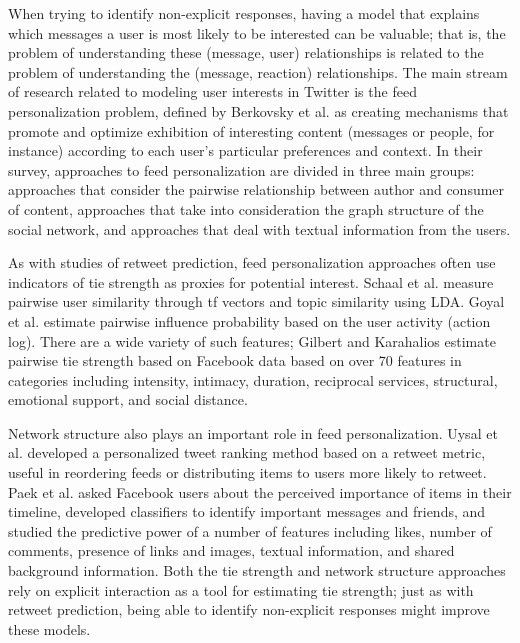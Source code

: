 When trying to identify non-explicit responses, having a model that explains which messages a user is most likely to be interested can be valuable; that is, the problem of understanding these (message, user) relationships is related to the problem of understanding the (message, reaction) relationships.  
The main stream of research related to modeling user interests in Twitter is the feed personalization problem, defined by Berkovsky et al. \cite{Berkovsky2015} as creating mechanisms that promote and optimize exhibition of interesting content (messages or people, for instance) according to each user's particular preferences and context.  
In their survey, approaches to feed personalization are divided in three main groups: approaches that consider the pairwise relationship between author and consumer of content, approaches that take into consideration the graph structure of the social network, and approaches that deal with textual information from the users.

As with studies of retweet prediction, feed personalization approaches often use indicators of tie strength as proxies for potential interest.  
Schaal et al. \cite{Schaal2012} measure pairwise user similarity through tf vectors and topic similarity using LDA. 
Goyal et al. \cite{Goyal2010} estimate pairwise influence probability based on the user activity (action log).  There are a wide variety of such features; Gilbert and Karahalios \cite{Gilbert2009} estimate pairwise tie strength based on Facebook data based on over 70 features in categories including intensity, intimacy, duration, reciprocal services, structural, emotional support, and social distance.  

Network structure also plays an important role in feed personalization.  
Uysal et al. \cite{Uysal2011} developed a personalized tweet ranking method based on a retweet metric, useful in reordering feeds or distributing items to users more likely to retweet. 
Paek et al. \cite{Paek2010} asked Facebook users about the perceived importance of items in their timeline, developed classifiers to identify important messages and friends, and studied the predictive power of a number of features including likes, number of comments, presence of links and images, textual information, and shared background information. 
Both the tie strength and network structure approaches rely on explicit interaction as a tool for estimating tie strength; just as with retweet prediction, being able to identify non-explicit responses might improve these models.

